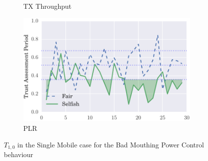 \documentclass[runningheads,a4paper]{llncs}
\begin{document}
\begin{figure}
\begin{subfigure}{0.32\textwidth}
  \caption{TX Throughput}
  \label{fig:single_mobile_badmouthing_txthroughput}
\end{subfigure}
\begin{subfigure}{0.32\textwidth}
\centering
  \includegraphics[width=.95\linewidth]{img/trust_bella_single_mobile_emph_PLR_BadMouthingPowerControl.pdf}
  \caption{PLR}
  \label{fig:single_mobile_badmouthing_plr}
\end{subfigure}
\caption{$T_{1,0}$ in the Single Mobile case for the Bad Mouthing Power Control behaviour}
\label{fig:single_mobile_badmouthing}
\end{figure}
\end{document}
